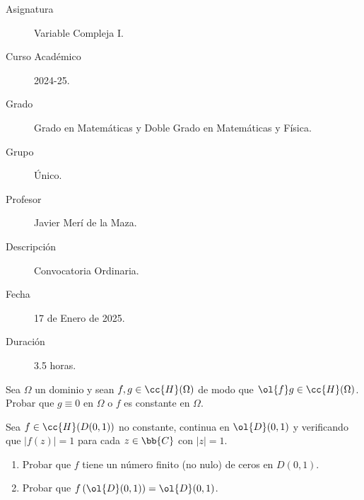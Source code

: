 \documentclass[12pt]{article}
\begin{document}

    
    

    \begin{description}
        \item[Asignatura] Variable Compleja I.
        \item[Curso Académico] 2024-25.
        \item[Grado] Grado en Matemáticas y Doble Grado en Matemáticas y Física.
        \item[Grupo] Único.
        \item[Profesor] Javier Merí de la Maza.
        \item[Descripción] Convocatoria Ordinaria.
        \item[Fecha] 17 de Enero de 2025.
        \item[Duración] 3.5 horas.
    \end{description}
    \newpage

    \begin{ejercicio}[2.5 puntos]
        Sea $\Omega$ un dominio y sean $f, g \in \cc{H}(\Omega)$ de modo que $\ol{f}g\in \cc{H}(\Omega)$.
        Probar que $g \equiv 0$ en $\Omega$ o $f$ es constante en $\Omega$.        
    \end{ejercicio}

    \begin{ejercicio}[2.5 puntos]
        Sea $f \in \cc{H}(D(0, 1))$ no constante, continua en $\ol{D}(0, 1)$ y verificando que $|f(z)| = 1$ para cada $z \in \bb{C}$ con $|z| = 1$.
        \begin{enumerate}
            \item Probar que $f$ tiene un número finito (no nulo) de ceros en $D(0, 1)$.
            \item Probar que $f\left(\ol{D}(0, 1)\right) = \ol{D}(0, 1)$.
        \end{enumerate}
    \end{ejercicio}
\end{document}
